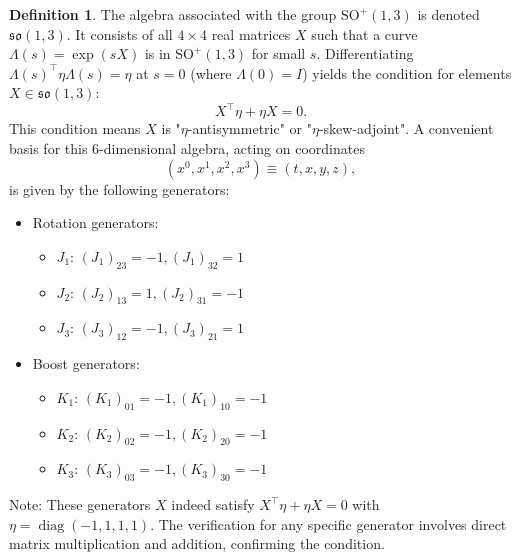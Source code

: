 \documentclass{amsart}
\theoremstyle{definition}
\newtheorem{definition}[theorem]{Definition}
\theoremstyle{remark}
\DeclareMathOperator{\diag}{diag}
\begin{document}
\begin{definition}
  The algebra associated with the group $\mathrm{SO}^+(1,3)$ is denoted $\mathfrak{so}(1,3)$.
  It consists of all \(4 \times 4\) real matrices \(X\) such that a curve $\Lambda(s) = \exp(sX)$ is in $\mathrm{SO}^+(1,3)$ for small $s$.
  Differentiating $\Lambda(s)^\top \eta \Lambda(s) = \eta$ at $s=0$ (where $\Lambda(0)=I$) yields the condition for elements $X \in \mathfrak{so}(1,3)$:
  \begin{equation*}
    X^\top \eta + \eta X = 0.
  \end{equation*}
  This condition means $X$ is "$\eta$-antisymmetric" or "$\eta$-skew-adjoint".
  A convenient basis for this 6-dimensional algebra, acting on coordinates
  \begin{equation*}
    (x^0, x^1, x^2, x^3) \equiv (t,x,y,z),
  \end{equation*}
  is given by the following generators:
  \begin{itemize}
    \item Rotation generators:
      \begin{itemize}
        \item $J_1$: $(J_1)_{23} = -1, (J_1)_{32} = 1$
        \item $J_2$: $(J_2)_{13} = 1, (J_2)_{31} = -1$
        \item $J_3$: $(J_3)_{12} = -1, (J_3)_{21} = 1$
      \end{itemize}
    \item Boost generators:
      \begin{itemize}
        \item $K_1$: $(K_1)_{01} = -1, (K_1)_{10} = -1$
        \item $K_2$: $(K_2)_{02} = -1, (K_2)_{20} = -1$
        \item $K_3$: $(K_3)_{03} = -1, (K_3)_{30} = -1$
    \end{itemize}
  \end{itemize}
  Note: These generators $X$ indeed satisfy $X^\top \eta + \eta X = 0$ with $\eta=\diag(-1,1,1,1)$.
  The verification for any specific generator involves direct matrix multiplication and addition, confirming the condition.
\end{definition}
\end{document}
